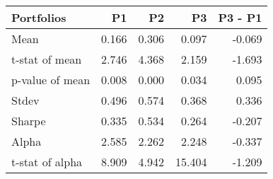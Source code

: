 \begin{tabular}{lrrrr}
\toprule
Portfolios & P1 & P2 & P3 & P3 - P1 \\
\midrule
Mean & 0.166 & 0.306 & 0.097 & -0.069 \\
t-stat of mean & 2.746 & 4.368 & 2.159 & -1.693 \\
p-value of mean & 0.008 & 0.000 & 0.034 & 0.095 \\
Stdev & 0.496 & 0.574 & 0.368 & 0.336 \\
Sharpe & 0.335 & 0.534 & 0.264 & -0.207 \\
Alpha & 2.585 & 2.262 & 2.248 & -0.337 \\
t-stat of alpha & 8.909 & 4.942 & 15.404 & -1.209 \\
\bottomrule
\end{tabular}
